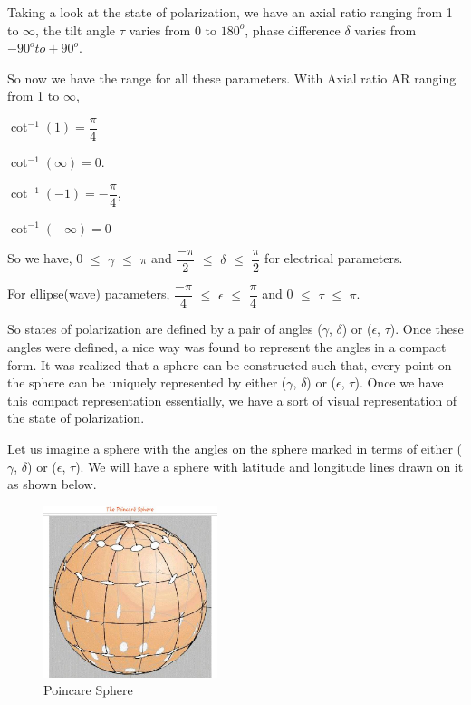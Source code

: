 Taking a look at the state of polarization, we have an axial ratio ranging from 1 to $\infty$, the tilt angle $\tau$ varies from 0 to $180^{o}$, phase difference $\delta$ varies from $-90^{o} to +90^{o}$.

So now we have the range for all these parameters. With Axial ratio AR ranging from 1 to $\infty$, 

$\cot^{-1}(1)= \dfrac{\pi}{4}$

$\cot^{-1}(\infty)= 0$.

$\cot^{-1}(-1) = -\dfrac{\pi}{4}$, 

$\cot^{-1}(-\infty) = 0$

So we have,  0 $\leq$ $\gamma$ $\leq$ $\pi$  and $\dfrac{-\pi}{2}$ $\leq$ $\delta$ $\leq$ $\dfrac{\pi}{2}$ for electrical parameters.

For ellipse(wave) parameters, $\dfrac{-\pi}{4}$ $\leq$ $\epsilon$ $\leq$ $\dfrac{\pi}{4}$ and 0 $\leq$ $\tau$ $\leq$ $\pi$.

So states of polarization are defined by a pair of angles ($\gamma$, $\delta$) or ($\epsilon$, $\tau$). Once these angles were defined, a nice way was found to represent the angles in a compact form. It was realized that a sphere can be constructed such that, every point on the sphere can be uniquely represented by either ($\gamma$, $\delta$) or ($\epsilon$, $\tau$). Once we have this compact representation essentially, we have a sort of visual representation of the state of polarization. 

Let us imagine a sphere with the angles on the sphere marked in terms of either ($\gamma$, $\delta$) or ($\epsilon$, $\tau$). We will have a sphere with latitude and longitude lines drawn on it as shown below.
\begin{figure}[h]
\centering
\includegraphics[height=5cm]{graphics/Poinccare}
\caption{Poincare Sphere}
\label{fig:poinccare}
\end{figure}

